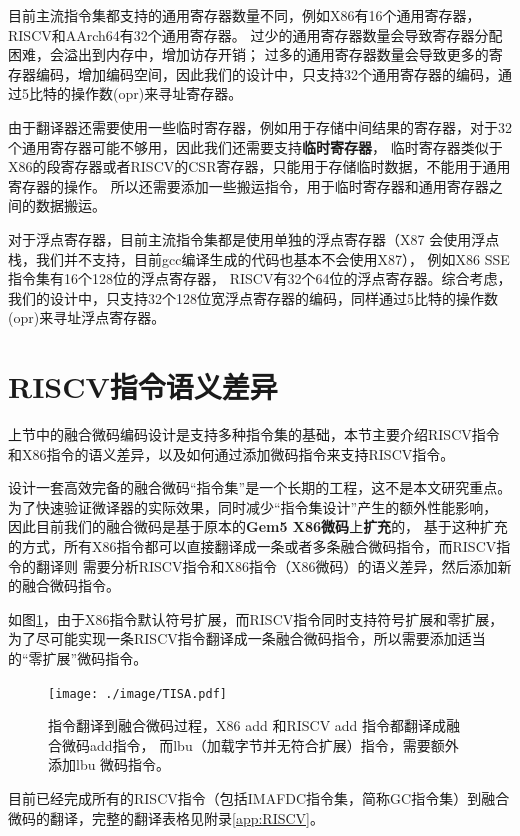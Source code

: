 目前主流指令集都支持的通用寄存器数量不同，例如X86有16个通用寄存器，RISCV和AArch64有32个通用寄存器。
过少的通用寄存器数量会导致寄存器分配困难，会溢出到内存中，增加访存开销；
过多的通用寄存器数量会导致更多的寄存器编码，增加编码空间，因此我们的设计中，只支持32个通用寄存器的编码，通过5比特的操作数(opr)来寻址寄存器。

由于翻译器还需要使用一些临时寄存器，例如用于存储中间结果的寄存器，对于32个通用寄存器可能不够用，因此我们还需要支持\textbf{临时寄存器}，
临时寄存器类似于X86的段寄存器或者RISCV的CSR寄存器，只能用于存储临时数据，不能用于通用寄存器的操作。
所以还需要添加一些搬运指令，用于临时寄存器和通用寄存器之间的数据搬运。

对于浮点寄存器，目前主流指令集都是使用单独的浮点寄存器（X87 会使用浮点栈，我们并不支持，目前gcc编译生成的代码也基本不会使用X87），
例如X86 SSE指令集有16个128位的浮点寄存器，
RISCV有32个64位的浮点寄存器。综合考虑，我们的设计中，只支持32个128位宽浮点寄存器的编码，同样通过5比特的操作数(opr)来寻址浮点寄存器。





\section{RISCV指令语义差异}

上节中的融合微码编码设计是支持多种指令集的基础，本节主要介绍RISCV指令和X86指令的语义差异，以及如何通过添加微码指令来支持RISCV指令。

设计一套高效完备的融合微码“指令集”是一个长期的工程，这不是本文研究重点。
为了快速验证微译器的实际效果，同时减少“指令集设计”产生的额外性能影响，
因此目前我们的融合微码是基于原本的\textbf{Gem5 X86微码}上\textbf{扩充}的，
基于这种扩充的方式，所有X86指令都可以直接翻译成一条或者多条融合微码指令，而RISCV指令的翻译则
需要分析RISCV指令和X86指令（X86微码）的语义差异，然后添加新的融合微码指令。

如图\ref{img:TISA}，由于X86指令默认符号扩展，而RISCV指令同时支持符号扩展和零扩展，
为了尽可能实现一条RISCV指令翻译成一条融合微码指令，所以需要添加适当的“零扩展”微码指令。

\begin{figure}[!htbp]
  \centering
  \texttt{[image: ./image/TISA.pdf]}
  \caption{指令翻译到融合微码过程，X86 add 和RISCV add 指令都翻译成融合微码add指令，
  而lbu（加载字节并无符合扩展）指令，需要额外添加lbu 微码指令。}
  \label{img:TISA}
\end{figure}



目前已经完成所有的RISCV指令（包括IMAFDC指令集，简称GC指令集）到融合微码的翻译，完整的翻译表格见附录\ref{app:RISCV}。

